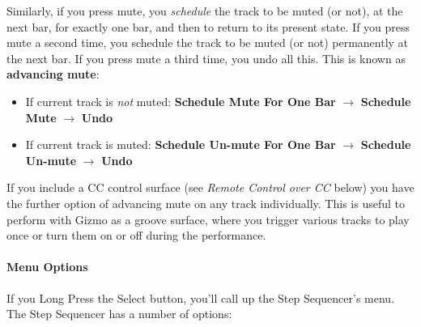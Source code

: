 \documentclass{article}
\begin{document}
Similarly, if you press mute, you {\it schedule} the track to be muted (or not), at the next bar, for exactly one bar, and then to return to its present state.  If you press mute a second time, you schedule the track to be muted (or not) permanently at the next bar.  If you press mute a third time, you undo all this.  This is known as {\bf advancing mute}:

\begin{itemize}
\item If current track is {\it not} muted: {\bf Schedule Mute For One Bar} \(\rightarrow\)  {\bf Schedule Mute} \(\rightarrow\) {\bf Undo}
\item If current track is muted: {\bf Schedule Un-mute For One Bar} \(\rightarrow\)  {\bf Schedule Un-mute} \(\rightarrow\) {\bf Undo}
\end{itemize}

If you include a CC control surface (see {\it Remote Control over CC} below) you have the further option of advancing mute on any track individually.  This is useful to perform with Gizmo as a groove surface, where you trigger various tracks to play once or turn them on or off during the performance.

\paragraph{Menu Options}

If you Long Press the Select button, you'll call up the Step Sequencer's menu.  The Step Sequencer has a number of options:
\end{document}
